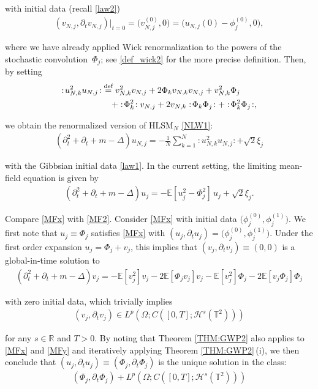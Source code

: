 \documentclass[letterpaper, 11pt,  reqno]{amsart}
\newcommand{\1}{\hspace{0.5mm}\text{I}\hspace{0.2mm}}
\newcommand{\noi}{\noindent}
\newcommand{\R}{\mathbb{R}}
\newcommand{\T}{\mathbb{T}}
\newcommand{\E}{\mathbb{E}}
\renewcommand{\H}{\mathcal{H}}
\newcommand{\Dl}{\Delta}
\newcommand{\dt}{\partial_t}
\newcommand{\HLS}{$\text{HLSM}_N$ }
\newcommand{\wick}[1]{:\!{#1}\!:}
\newcommand{\deff}{\stackrel{\textup{def}}{=}}
\renewcommand{\O}{\Omega}
\numberwithin{equation}{section}
\numberwithin{theorem}{section}
\begin{document}
\noi
with initial data (recall \eqref{law2})
\begin{align*}
(v_{N, j}, \dt v_{N, j})|_{t = 0} = 
\big(v_{N, j}^{(0)}, 0\big)
= 
\big(u_{N, j}(0) - \phi_j^{(0)}, 0\big), 
\end{align*}

\noi
where we have already applied Wick renormalization 
to the powers of the stochastic convolution~$\Phi_j$;
 see \eqref{def_wick2} for the more precise definition. 
Then, by setting
\begin{align*}
\wick{ u_{N, k}^2 u_{N, j} } 
& \deff 
v_{N, k}^2 v_{N, j}
+ 2 \Phi_k v_{N, k} v_{N, j}
  + v_{N, k}^2 \Phi_j \\
& 
\quad \,
 + \wick{\Phi_k^2} v_{N, j} + 2 v_{N, k} \wick{ \Phi_k \Phi_j } 
+ \wick{\Phi_k^2 \Phi_j} , 
\end{align*}

\noi
we obtain the renormalized version of
\HLS \eqref{NLW1}:
\begin{align}
    (\dt^2 + \dt + m - \Dl) u_{N, j} = - \frac{1}{N} \sum_{k = 1}^N \wick{ u_{N, k}^2 u_{N, j} } + \sqrt{2} \xi_j
\label{SdNLW1}
\end{align}

\noi
with the Gibbsian initial data \eqref{law1}.
In the current setting, the limiting mean-field equation is given by 
\begin{align}
    (\dt^2 + \dt + m - \Dl) u_j = - \E [ u_j^2 - \Phi_j^2 ] \, u_j + \sqrt{2} \xi_j.
\label{MFx}
\end{align}

\noi
Compare \eqref{MFx} with \eqref{MF2}.
Consider \eqref{MFx}
with  initial data $\big(\phi^{(0)}_j, \phi^{(1)}_j\big)$.
We first note that  $u_j \equiv \Phi_j$
satisfies \eqref{MFx}
with $(u_j, \dt u_j) = \big(\phi^{(0)}_j, \phi^{(1)}_j\big)$.
Under the first order expansion
$u_j = \Phi_j + v_j$, 
this implies that 
$(v_j, \dt v_j) \equiv (0, 0)$
is a global-in-time solution to 
\begin{align}
(\dt^2 + \dt + m - \Dl) v_j = 
- \E [ v_j^2 ] v_j
- 2 \E [ \Phi_j v_j ] v_j 
- \E [ v_j^2 ] \Phi_j 
- 2 \E [ v_j \Phi_j  ] \Phi_j 
\label{MFy}
\end{align}

\noi
with zero initial data,
which trivially implies
\begin{align}
(v_j, \dt v_j)  \in 
L^p(\O; C([0, T]; \H^s(\T^2)))
\label{class5}
\end{align}

\noi
for any $s \in \R$ and $T > 0$.
By noting that  Theorem \ref{THM:GWP2}
also applies to \eqref{MFx} and \eqref{MFy}
and iteratively applying
Theorem \ref{THM:GWP2}\,(i), 
we then conclude that 
$(u_j, \dt u_j)  \equiv (\Phi_j, \dt \Phi_j) $ is the unique solution
in the class:
\begin{align}
( \Phi_j, \dt \Phi_j)  + L^p(\O; C([0, T]; \H^s(\T^2)))
 \label{class4}
\end{align}
\end{document}
